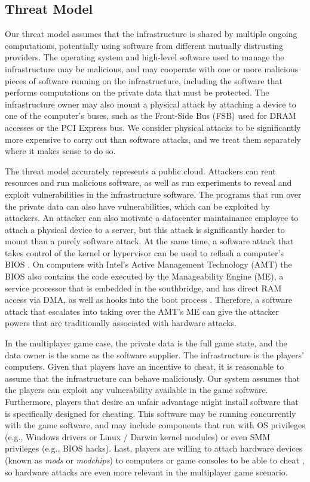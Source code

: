 \subsection{Threat Model}
\label{sec:threat}

Our threat model assumes that the infrastructure is shared by multiple ongoing
computations, potentially using software from different mutually distrusting
providers. The operating system and high-level software used to manage the
infrastructure may be malicious, and may cooperate with one or more malicious
pieces of software running on the infrastructure, including the software that
performs computations on the private data that must be protected. The
infrastructure owner may also mount a physical attack by attaching a device to
one of the computer's buses, such as the Front-Side Bus (FSB) used for DRAM
accesses or the PCI Express bus. We consider physical attacks to be
significantly more expensive to carry out than software attacks, and we treat
them separately where it makes sense to do so.

The threat model accurately represents a public cloud. Attackers can rent
resources and run malicious software, as well as run experiments to reveal and
exploit vulnerabilities in the infrastructure software. The programs that run
over the private data can also have vulnerabilities, which can be exploited by
attackers. An attacker can also motivate a datacenter maintainance employee to
attach a physical device to a server, but this attack is significantly harder
to mount than a purely software attack. At the same time, a software attack
that takes control of the kernel or hypervisor can be used to reflash a
computer's BIOS \cite{wojtczuk2010bios}. On computers with Intel's Active
Management Technology (AMT) \cite{intel2013amt} the BIOS also contains the code
executed by the Manageability Engine (ME), a service processor that is embedded
in the southbridge, and has direct RAM access via DMA, as well as hooks into
the boot process \cite{tereshkin2009amt}. Therefore, a software attack that
escalates into taking over the AMT's ME can give the attacker powers that are
traditionally associated with hardware attacks.

In the multiplayer game case, the private data is the full game state, and the
data owner is the same as the software supplier. The infrastructure is the
players' computers. Given that players have an incentive to cheat, it is
reasonable to assume that the infrastructure can behave maliciously. Our system
assumes that the players can exploit any vulnerability available in the game
software. Furthermore, players that desire an unfair advantage might install
software that is specifically designed for cheating. This software may be
running concurrently with the game software, and may include components that
run with OS privileges (e.g., Windows drivers or Linux / Darwin kernel
modules) or even SMM privileges (e.g., BIOS hacks). Last, players are willing
to attach hardware devices (known as \textit{mods} or \textit{modchips}) to
computers or game consoles to be able to cheat \cite{harris2007mod}, so
hardware attacks are even more relevant in the multiplayer game scenario.

